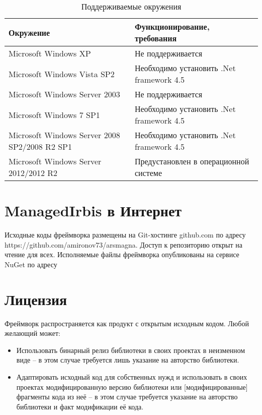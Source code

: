 \begin{table}[htbp]
	\centering
	\begin{tabular}{ | p{} | p{} | }
	\hline
	\textbf{Окружение} & 
	\textbf{Функционирование, требования}
	\\
	\hline
	\hline
	Microsoft Windows XP & Не поддерживается \\
	\hline
	Microsoft Windows Vista SP2 & Необходимо установить .Net framework 4.5 \\
	\hline
	Microsoft Windows Server 2003 & Не поддерживается \\
	\hline
	Microsoft Windows 7 SP1 & Необходимо установить .Net framework 4.5 \\
	\hline
	Microsoft Windows Server 2008 SP2/2008 R2 SP1 & Необходимо установить .Net framework 4.5 \\
	\hline
	Microsoft Windows Server 2012/2012 R2 & Предустановлен в операционной системе \\
	\hline
	\end{tabular}
	\caption{Поддерживаемые окружения}
\end{table}

\section*{ManagedIrbis в Интернет}

Исходные коды фреймворка размещены на Git-хостинге github.com по адресу https://github.com/amironov73/arsmagna. Доступ к репозиторию открыт на чтение для всех.
Исполняемые файлы фреймворка опубликованы на сервисе NuGet по адресу

\section*{Лицензия}

Фреймворк распространяется как продукт с открытым исходным кодом. Любой желающий может:

\begin{itemize}
	\item Использовать бинарный релиз библиотеки в своих проектах в неизменном виде – в этом случае требуется лишь указание на авторство библиотеки.
	\item Адаптировать исходный код для собственных нужд и использовать в своих проектах модифицированную версию библиотеки или [модифицированные] фрагменты кода из неё – в этом случае требуется указание на авторство библиотеки и факт модификации её кода.
\end{itemize}

